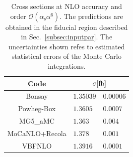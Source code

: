 \documentclass[twocolumn,epjc3]{svjour3} %
\newcommand{\alphas}{\ensuremath{\alpha_\text{s}}\xspace}
\begin{document}
    \begin{table}[h!]
        \centering
        \begin{tabular}{c|r@{ $\pm$ }l}
          Code  &  \multicolumn{2}{c}{$\sigma[\rm{fb}]$}  \\
            \hline
            \hline
            {\sc Bonsay}  &  $1.35039$ & $0.00006$  \\
            {\sc Powheg-Box}  &  $1.3605\phantom{0}$  & $0.0007$   \\
            {\sc MG5\_aMC}&  $1.363\phantom{0}\phantom{0}$ & $0.004$  \\
            {\sc MoCaNLO+Recola}  &  $ 1.378\phantom{0}\phantom{0}$ & $0.001$ \\
            {\sc VBFNLO}  &  $1.3916\phantom{0}$ & $0.0001$  \\
        \end{tabular}
        \caption{\label{tab:wg1_NLOrates} Cross sections at NLO accuracy and order $\mathcal{O}(\alphas\alpha^6)$.
        The predictions are obtained in the fiducial region described in Sec.~\protect\ref{subsec:inputpar}.
        The uncertainties shown refes to estimated statistical errors of the Monte Carlo integrations.}
    \end{table}
\end{document}
